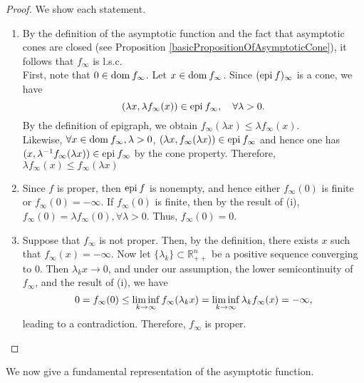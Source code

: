 \documentclass[a4paper,11pt, oneside]{book}
\theoremstyle{definition}
\newcommand{\NDemenstionalRealEuclideanSpace}{\mathbb{R}^n}
\newcommand{\Domain}[1]{\text{\rm dom\:${#1}$}} %
\newcommand{\Epigraph}[1]{\text{\rm epi\:${#1}$}} %
\begin{document}
\begin{proof}
  We show each statement.
  \begin{enumerate}[label=\roman*,align=CenterWithParen]
    \item By the definition of the asymptotic function and the fact that asymptotic cones are closed (see Proposition \ref{basicPropositionOfAsymptoticCone}), it follows that $f_{\infty}$ is l.s.c. \\
    First, note that $0 \in \Domain{f_{\infty}}$. Let $x \in \Domain{f_{\infty}}$. Since $(\Epigraph{f})_{\infty}$ is a cone, we have
    \begin{equation}
      (\lambda x, \lambda f_{\infty}(x)) \in \Epigraph{f_{\infty}}, \quad \forall \lambda > 0. \notag
    \end{equation}
    By the definition of epigraph, we obtain $f_{\infty} (\lambda x) \leq \lambda f_{\infty}(x)$. \\
    Likewise, $\forall x \in \Domain{f_{\infty}}, \lambda > 0$, $(\lambda x, f_{\infty}(\lambda x)) \in \Epigraph{f_{\infty}}$ and hence one has $(x, \lambda^{-1}f_{\infty}(\lambda x)) \in \Epigraph{f_\infty}$ by the cone property. Therefore, $\lambda f_{\infty}(x) \leq f_{\infty} (\lambda x)$
    \item Since $f$ is proper, then $\Epigraph{f}$ is nonempty, and hence either $f_{\infty}(0)$ is finite or $f_{\infty}(0) = - \infty$. If $f_{\infty}(0)$ is finite, then by the result of (i), $f_{\infty}(0) = \lambda f_{\infty}(0), \forall \lambda > 0$. Thus, $f_{\infty}(0) = 0$.
  \item Suppose that $f_{\infty}$ is not proper. Then, by the definition, there exists $x$ such that $f_{\infty}(x) = -\infty$. Now let $\{\lambda_k\} \subset \NDemenstionalRealEuclideanSpace_{++}$ be a positive sequence converging to $0$. Then $\lambda_k x \rightarrow 0$, and under our assumption, the lower semicontinuity of $f_{\infty}$, and the result of (i), we have
  \begin{equation}
    0 = f_{\infty}(0) \leq \liminf_{k \to \infty} f_{\infty}(\lambda_k x) = \liminf_{k \to \infty} \lambda_k f_{\infty}(x) = - \infty, \notag
  \end{equation}
  leading to a contradiction. Therefore, $f_{\infty}$ is proper.
  \end{enumerate}
\end{proof}

We now give a fundamental representation of the asymptotic function.
\end{document}
